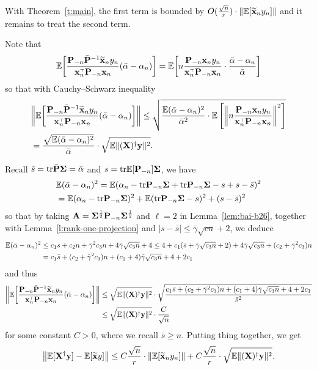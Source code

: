 \documentclass[11pt]{article}
\begin{document}
With Theorem~\ref{t:main}, the first term is bounded by $O(\frac{\sqrt n}{r})\cdot \|\mathbb E[\widetilde{\mathbf x}_ny_n]\|$ and it remains to treat the second term.

Note that
\[
  \E\bigg[\frac{\P_{-n}\bar\P^{-1}\xbt_ny_n}{\x_n^\top\P_{-n}\x_n} (\bar\alpha-\alpha_n)\bigg] = \E\bigg[ n \frac{\P_{-n} \x_n y_n}{\x_n^\top\P_{-n}\x_n} \cdot \frac{\bar\alpha-\alpha_n}{\bar \alpha} \bigg]
\]
so that with Cauchy–Schwarz inequality
\begin{align*}
  &\bigg\|\E\bigg[\frac{\P_{-n}\bar\P^{-1}\xbt_ny_n}{\x_n^\top\P_{-n}\x_n} (\bar\alpha-\alpha_n)\bigg]\bigg\| \le \sqrt{ \frac{ \E (\bar \alpha - \alpha_n)^2 }{\bar \alpha^2 } \cdot \E \left[ \left\|  n \frac{\P_{-n} \x_n y_n}{\x_n^\top\P_{-n}\x_n} \right\|^2 \right]  } \\ 
  &= \frac{ \sqrt{ \E (\bar \alpha - \alpha_n)^2 } }{\bar \alpha }  \cdot \sqrt{ \E \| (\X)^\dagger \y \|^2 }.
\end{align*}

Recall $\bar s = \mathrm{tr} \bar {\mathbf P} \mathbf{\Sigma} = \bar \alpha$ and $s = \mathrm{tr} \mathbb E[\mathbf P_{-n}] \mathbf{\Sigma}$, we have
\begin{align*}
  &\mathbb E (\bar \alpha - \alpha_n)^2 = \mathbb E (\alpha_n - \mathrm{tr} \mathbf P_{-n} \mathbf{\Sigma} + \mathrm{tr} \mathbf P_{-n} \mathbf{\Sigma} - s + s - \bar s)^2 \\ 
  &= \mathbb E (\alpha_n - \mathrm{tr} \mathbf P_{-n} \mathbf{\Sigma})^2 + \mathbb E (\mathrm{tr} \mathbf P_{-n} \mathbf{\Sigma} - s)^2 + (s - \bar s)^2  
\end{align*}
so that by taking $\mathbf A = \mathbf{\Sigma}^{\frac12} \mathbf P_{-n} \mathbf{\Sigma}^{\frac12}$ and $\ell = 2$ in Lemma~\ref{lem:bai-b26}, together with Lemma~\ref{l:rank-one-projection} and $|s - \bar s| \le \bar \gamma \sqrt{cn} + 2$, we deduce
\begin{align*}
  \mathbb E (\bar \alpha - \alpha_n)^2 &\le c_1 s + c_2 n + \bar \gamma^2 c_3 n + 4 \bar \gamma \sqrt{c_3 n} + 4 \le 4 + c_1 (\bar s + \bar \gamma \sqrt{c_3 n} + 2) + 4 \bar \gamma \sqrt{c_3 n} + (c_2 + \bar \gamma^2 c_3)n \\ 
  &= c_1 \bar s + (c_2 + \bar \gamma^2 c_3)n + (c_1 + 4)\bar \gamma \sqrt{c_3 n} + 4 + 2 c_1
\end{align*}
and thus
\begin{align*}
  \bigg\|\E\bigg[\frac{\P_{-n}\bar\P^{-1}\xbt_ny_n}{\x_n^\top\P_{-n}\x_n} (\bar\alpha-\alpha_n)\bigg]\bigg\| &\le \sqrt{ \E \| (\X)^\dagger \y \|^2 } \cdot \sqrt{ \frac{ c_1 \bar s + (c_2 + \bar \gamma^2 c_3)n + (c_1 + 4)\bar \gamma \sqrt{c_3 n} + 4 + 2 c_1 }{\bar s^2} } \\ 
  &\le \sqrt{ \E \| (\X)^\dagger \y \|^2 } \cdot \frac{C}{\sqrt n}
\end{align*}
for some constant $C> 0$, where we recall $\bar s \ge n$. Putting thing together, we get
\begin{equation}
  \big\|\mathbb E[\mathbf X^\dagger\mathbf y]-\mathbb E[\widetilde{\mathbf x} y]\big\| \leq C \frac{\sqrt n}{r}
  \cdot\|\mathbb E[\widetilde{\mathbf x}_ny_n]\| + C\frac{\sqrt n}{r} \cdot \sqrt{ \mathbb E \|
    (\mathbf X)^\dagger \mathbf y \|^2 }. 
\end{equation}
\end{document}
